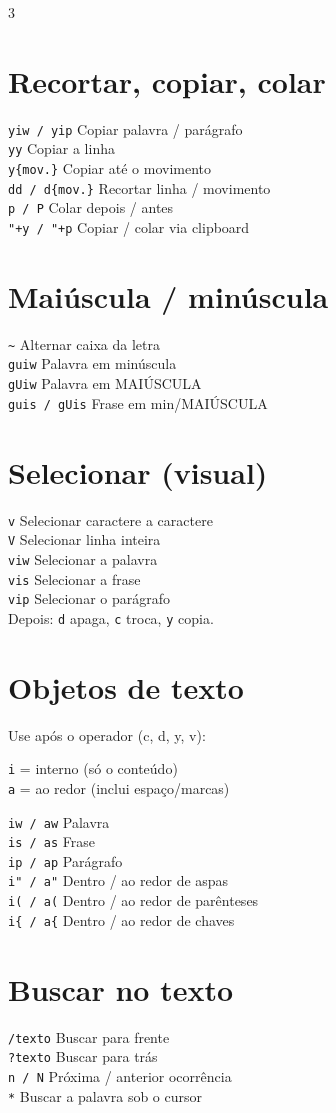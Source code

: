 \documentclass[10pt,a4paper]{article}
\newcommand{\key}[1]{{\small\texttt{#1}}}
\newcommand{\desc}[1]{{\small #1}}
\newcommand{\K}[2]{\key{#1} \hfill \desc{#2}\\[1.5pt]}
\begin{document}
\begin{multicols}{3}
\section{Recortar, copiar, colar}
\K{yiw / yip}{Copiar palavra / par\'agrafo}
\K{yy}{Copiar a linha}
\K{y\{mov.\}}{Copiar at\'e o movimento}
\K{dd / d\{mov.\}}{Recortar linha / movimento}
\K{p / P}{Colar depois / antes}
\K{"+y / "+p}{Copiar / colar via clipboard}

\section{Mai\'uscula / min\'uscula}
\K{\~{}}{Alternar caixa da letra}
\K{guiw}{Palavra em min\'uscula}
\K{gUiw}{Palavra em MAI\'USCULA}
\K{guis / gUis}{Frase em min/MAI\'USCULA}

\section{Selecionar (visual)}
\K{v}{Selecionar caractere a caractere}
\K{V}{Selecionar linha inteira}
\K{viw}{Selecionar a palavra}
\K{vis}{Selecionar a frase}
\K{vip}{Selecionar o par\'agrafo}
\desc{Depois: \texttt{d} apaga, \texttt{c} troca, \texttt{y} copia.}

\section{Objetos de texto}

Use ap\'os o operador (c, d, y, v):

\texttt{i} = interno (s\'o o conte\'udo)\\
\texttt{a} = ao redor (inclui espa\c{c}o/marcas)

\vspace{3pt}
\K{iw / aw}{Palavra}
\K{is / as}{Frase}
\K{ip / ap}{Par\'agrafo}
\K{i" / a"}{Dentro / ao redor de aspas}
\K{i( / a(}{Dentro / ao redor de par\^enteses}
\K{i\{ / a\{}{Dentro / ao redor de chaves}

\section{Buscar no texto}
\K{/texto}{Buscar para frente}
\K{?texto}{Buscar para tr\'as}
\K{n / N}{Pr\'oxima / anterior ocorr\^encia}
\K{*}{Buscar a palavra sob o cursor}


\end{multicols}
\end{document}
